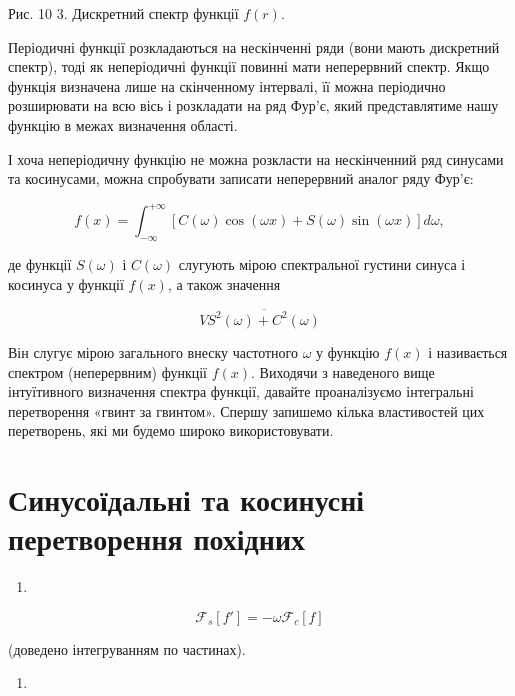 \documentclass[
  ukrainian,
]{article}
\providecommand{\tightlist}{%
  \setlength{\itemsep}{0pt}\setlength{\parskip}{0pt}}
\begin{document}
Рис. 10 3. Дискретний спектр функції \(f(r)\).

Періодичні функції розкладаються на нескінченні ряди (вони мають
дискретний спектр), тоді як неперіодичні функції повинні мати
неперервний спектр. Якщо функція визначена лише на скінченному
інтервалі, її можна періодично розширювати на всю вісь і розкладати на
ряд Фур'є, який представлятиме нашу функцію в межах визначення області.

І хоча неперіодичну функцію не можна розкласти на нескінченний ряд
синусами та косинусами, можна спробувати записати неперервний аналог
ряду Фур'є:

\[
f(x) = \int_{-\infty}^{+\infty} [C(\omega)\cos(\omega x) + S(\omega)\sin(\omega x)] d\omega,
\]

де функції \(S(\omega)\) і \(C(\omega)\) слугують мірою спектральної
густини синуса і косинуса у функції \(f(x)\), а також значення

\[
V \overline{S^2(\omega) + C^2(\omega)}
\]

Він слугує мірою загального внеску частотного \(\omega\) у функцію
\(f(x)\) і називається спектром (неперервним) функції \(f(x)\). Виходячи
з наведеного вище інтуїтивного визначення спектра функції, давайте
проаналізуємо інтегральні перетворення «гвинт за гвинтом». Спершу
запишемо кілька властивостей цих перетворень, які ми будемо широко
використовувати.

\section{Синусоїдальні та косинусні перетворення
похідних}\label{ux441ux438ux43dux443ux441ux43eux457ux434ux430ux43bux44cux43dux456-ux442ux430-ux43aux43eux441ux438ux43dux443ux441ux43dux456-ux43fux435ux440ux435ux442ux432ux43eux440ux435ux43dux43dux44f-ux43fux43eux445ux456ux434ux43dux438ux445}

\begin{enumerate}
\def\labelenumi{\arabic{enumi}.}
\tightlist
\item
\end{enumerate}

\[
\mathcal{F}_s[f'] = -\omega \mathcal{F}_c[f]
\]

(доведено інтегруванням по частинах).

\begin{enumerate}
\def\labelenumi{\arabic{enumi}.}
\tightlist
\item
\end{enumerate}
\end{document}
